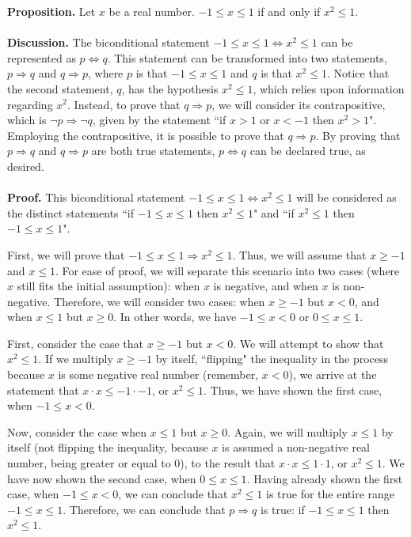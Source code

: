 \documentclass[12pt]{exam}
\begin{document}
\begin{questions}
\question
\textbf{Proposition.} Let $x$ be a real number. $-1\leq x\leq1$ if and only if $x^2\leq1$.
\\
\\\textbf{Discussion.} The biconditional statement $-1\leq x\leq1 \Leftrightarrow x^2\leq1$ can be represented as $p\Leftrightarrow q$. This statement can be transformed into two statements, $p\Rightarrow q$ and $q\Rightarrow p$, where $p$ is that $-1\leq x\leq1$  and $q$ is that $x^2\leq1$. Notice that the second statement, $q$, has the hypothesis $x^2\leq1$, which relies upon information regarding $x^2$. Instead, to prove that $q\Rightarrow p$, we will consider its contrapositive, which is $\neg p \Rightarrow \neg q$, given by the statement ``if  $x>1$ or $x<-1 $ then $ x^2>1$". Employing the contrapositive, it is possible to prove that  $q\Rightarrow p$. By proving that $p\Rightarrow q$ and $q\Rightarrow p$ are both true statements, $p\Leftrightarrow q$ can be declared true, as desired.
\\
\\\textbf{Proof.} This biconditional statement $-1\leq x\leq1 \Leftrightarrow x^2\leq1$ will be considered as the distinct statements ``if $-1\leq x\leq1 $ then $ x^2\leq1$" and ``if $x^2\leq1$ then $ -1\leq x\leq1$". 
\par
First, we will prove that $-1\leq x\leq1\Rightarrow x^2\leq1$. Thus, we will assume that $x \geq -1$ and $x \leq1$. For ease of proof, we will separate this scenario into two cases (where $x$ still fits the initial assumption): when $x$ is negative, and when $x$ is non-negative. Therefore, we will consider two cases: when $x \geq -1$ but $x<0$, and when $x \leq1$ but $x\geq0$. In other words, we have $-1 \leq x < 0$ or $0\leq x \leq 1$.
\par
First, consider the case that $x \geq -1$ but $x<0$. We will attempt to show that $x^2\leq1$. If we multiply  $x \geq -1$ by itself, ``flipping" the inequality in the process because $x$ is some negative real number (remember,  $x<0$), we arrive at the statement that $x \cdot x \leq -1 \cdot -1$, or $x^2 \leq 1$. Thus, we have shown the first case, when  $-1 \leq x < 0$.
\par
Now, consider the case when $x \leq1$ but $x\geq0$. Again, we will multiply $x \leq1$ by itself (not flipping the inequality, because $x$ is assumed a non-negative real number, being greater or equal to $0$), to the result that $x \cdot x \leq 1 \cdot 1$, or $x^2 \leq 1$. We have now shown the second case, when $0\leq x \leq 1$. Having already shown the first case, when $-1 \leq x < 0$, we can conclude that $x^2 \leq 1$ is true for the entire range $-1\leq x\leq1$. Therefore, we can conclude that $p \Rightarrow q$ is true: if $-1\leq x\leq1$ then $x^2\leq1$.

\end{questions}
\end{document}
